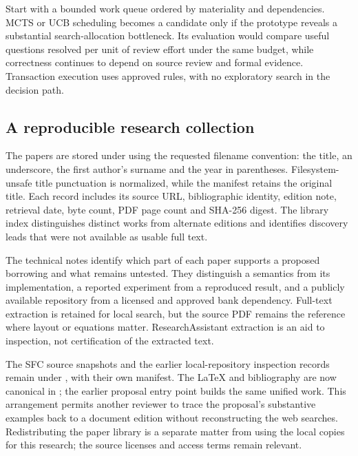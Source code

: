 Start with a bounded work queue ordered by materiality and dependencies. MCTS or
UCB scheduling becomes a candidate only if the prototype reveals a substantial
search-allocation bottleneck. Its evaluation would compare useful questions
resolved per unit of review effort under the same budget, while correctness
continues to depend on source review and formal evidence. Transaction execution
uses approved rules, with no exploratory search in the decision path.



\subsection{A reproducible research collection}
\label{merge:P-05-evidence:02}


The papers are stored under  using the requested filename
convention: the title, an underscore, the first author's surname and the year in
parentheses. Filesystem-unsafe title punctuation is normalized, while the manifest
retains the original title. Each
record includes its source URL, bibliographic identity, edition note, retrieval
date, byte count, PDF page count and SHA-256 digest. The library index distinguishes
distinct works from alternate editions and identifies discovery leads that were
not available as usable full text.

The technical notes identify which part of each paper supports a proposed
borrowing and what remains untested. They distinguish a semantics from its
implementation, a reported experiment from a reproduced result, and a publicly
available repository from a licensed and approved bank dependency. Full-text
extraction is retained for local search, but the source PDF remains the reference
where layout or equations matter. ResearchAssistant extraction is an aid to
inspection, not certification of the extracted text.


The SFC source snapshots and the earlier local-repository inspection records
remain under , with their own manifest. The LaTeX and
bibliography are now canonical in ; the earlier
proposal entry point builds the same unified work. This arrangement permits another
reviewer to trace the proposal's substantive examples back to a document edition
without reconstructing the web searches. Redistributing the paper library is a
separate matter from using the local copies for this research; the source licenses
and access terms remain relevant.

